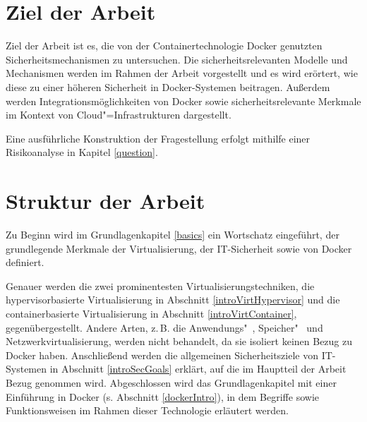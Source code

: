 \documentclass[../main.tex]{subfiles}
\begin{document}


  \section{Ziel der Arbeit}
    Ziel der Arbeit ist es, die von der Containertechnologie Docker genutzten Sicherheitsmechanismen zu untersuchen. Die sicherheitsrelevanten Modelle und Mechanismen werden im Rahmen der Arbeit vorgestellt und es wird erörtert, wie diese zu einer höheren Sicherheit in Docker-Systemen beitragen.
    Außerdem werden Integrationsmöglichkeiten von Docker sowie sicherheitsrelevante Merkmale im Kontext von Cloud"=Infrastrukturen dargestellt.

    Eine ausführliche Konstruktion der Fragestellung erfolgt mithilfe einer Risikoanalyse in Kapitel \ref{question}.

  \section{Struktur der Arbeit}
    Zu Beginn wird im Grundlagenkapitel \ref{basics} ein Wortschatz eingeführt, der grundlegende Merkmale der Virtualisierung, der \acrshort{IT}-Sicherheit sowie von Docker definiert.

    Genauer werden die zwei prominentesten Virtualisierungstechniken, die hypervisorbasierte Virtualisierung in Abschnitt \ref{introVirtHypervisor} und die containerbasierte Virtualisierung in Abschnitt \ref{introVirtContainer}, gegenübergestellt. Andere Arten, z.\,B. die Anwendungs"~, Spei\-cher"~ und Netzwerkvirtualisierung, werden nicht behandelt, da sie isoliert keinen Bezug zu Docker haben.  %
    Anschließend werden die allgemeinen Sicherheitsziele von \acrshort{IT}-Systemen in Abschnitt \ref{introSecGoals} erklärt, auf die im Hauptteil der Arbeit Bezug genommen wird. Abgeschlossen wird das Grundlagenkapitel mit einer Einführung in Docker (s. Abschnitt \ref{dockerIntro}), in dem Begriffe sowie Funktionsweisen im Rahmen dieser Technologie erläutert werden.
\end{document}
